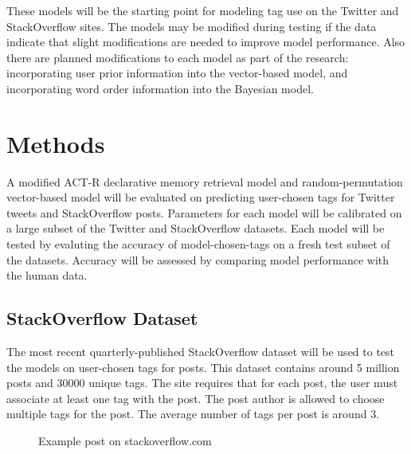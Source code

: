 \documentclass[man,floatsintext]{apa6}
\begin{document}
These models will be the starting point for modeling tag use on the Twitter and StackOverflow sites.
The models may be modified during testing if the data indicate that slight modifications are needed to improve model performance.
Also there are planned modifications to each model as part of the research:
incorporating user prior information into the vector-based model, and incorporating word order information into the Bayesian model.

\section{Methods}

A modified ACT-R declarative memory retrieval model and random-permutation vector-based model will be evaluated on predicting user-chosen tags for Twitter tweets and StackOverflow posts.
Parameters for each model will be calibrated on a large subset of the Twitter and StackOverflow datasets.
Each model will be tested by evaluting the accuracy of model-chosen-tags on a fresh test subset of the datasets.
Accuracy will be assessed by comparing model performance with the human data.

\subsection{StackOverflow Dataset}

The most recent quarterly-published StackOverflow dataset \parencite{DataDump2013} will be used to test the models on user-chosen tags for posts.
This dataset contains around 5 million posts and \num{30000} unique tags.
The site requires that for each post, the user must associate at least one tag with the post.
The post author is allowed to choose multiple tags for the post.
The average number of tags per post is around 3.

\begin{figure}[ht]
  \caption{Example post on stackoverflow.com}
  \label{figSOExample}
\end{figure}
\end{document}
